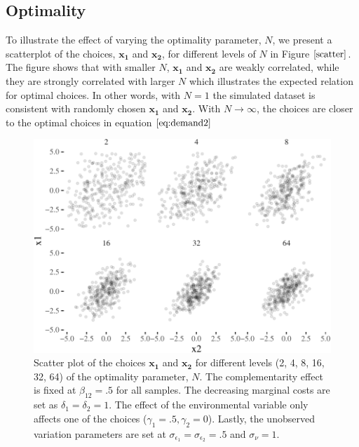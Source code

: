 \documentclass[12pt]{article}
\begin{document}
\subsection{Optimality}\label{optimality}

To illustrate the effect of varying the optimality parameter, \(N\), we
present a scatterplot of the choices, \(\mathbf{x_1}\) and
\(\mathbf{x_2}\), for different levels of \(N\) in Figure
\(\ref{scatter}\). The figure shows that with smaller \(N\),
\(\mathbf{x_1}\) and \(\mathbf{x_2}\) are weakly correlated, while they
are strongly correlated with larger \(N\) which illustrates the expected
relation for optimal choices. In other words, with \(N=1\) the simulated
dataset is consistent with randomly chosen \(\mathbf{x_1}\) and
\(\mathbf{x_2}\). With \(N \to \infty\), the choices are closer to the
optimal choices in equation \(\eqref{eq:demand2}\)

\begin{figure}

\includegraphics[width=500px]{figure-latex/scatter-1}
\caption[Distribution of Choices for Different Levels of
Optimality]{\label{scatter} Scatter plot of the choices $\mathbf{x_1}$ and
$\mathbf{x_2}$ for different levels (2, 4, 8, 16, 32, 64) of the optimality
parameter, $N$. The complementarity effect is fixed at $\beta_{12} = .5$ for all
samples. The decreasing marginal costs are set as $\delta_1 = \delta_2 = 1$. The
effect of the environmental variable only affects one of the choices
($\gamma_1 = .5, \gamma_2 = 0$). Lastly, the unobserved variation parameters are
set at $\sigma_{\epsilon_1} = \sigma_{\epsilon_2} = .5$ and $\sigma_{\nu} = 1.$}
\end{figure}
\end{document}
